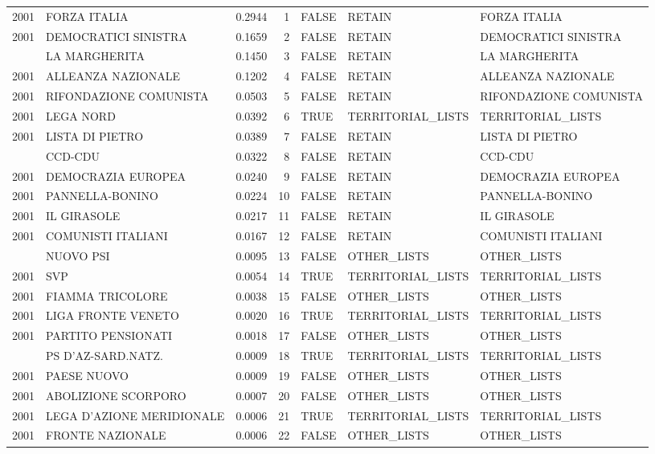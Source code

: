 \begin{longtable}[t]{rlrrlll}
2001 & FORZA ITALIA & 0.2944 & 1 & FALSE & RETAIN & FORZA ITALIA\\
2001 & DEMOCRATICI SINISTRA & 0.1659 & 2 & FALSE & RETAIN & DEMOCRATICI SINISTRA\\
\addlinespace
2001 & LA MARGHERITA & 0.1450 & 3 & FALSE & RETAIN & LA MARGHERITA\\
2001 & ALLEANZA NAZIONALE & 0.1202 & 4 & FALSE & RETAIN & ALLEANZA NAZIONALE\\
2001 & RIFONDAZIONE COMUNISTA & 0.0503 & 5 & FALSE & RETAIN & RIFONDAZIONE COMUNISTA\\
2001 & LEGA NORD & 0.0392 & 6 & TRUE & TERRITORIAL\_LISTS & TERRITORIAL\_LISTS\\
2001 & LISTA DI PIETRO & 0.0389 & 7 & FALSE & RETAIN & LISTA DI PIETRO\\
\addlinespace
2001 & CCD-CDU & 0.0322 & 8 & FALSE & RETAIN & CCD-CDU\\
2001 & DEMOCRAZIA EUROPEA & 0.0240 & 9 & FALSE & RETAIN & DEMOCRAZIA EUROPEA\\
2001 & PANNELLA-BONINO & 0.0224 & 10 & FALSE & RETAIN & PANNELLA-BONINO\\
2001 & IL GIRASOLE & 0.0217 & 11 & FALSE & RETAIN & IL GIRASOLE\\
2001 & COMUNISTI ITALIANI & 0.0167 & 12 & FALSE & RETAIN & COMUNISTI ITALIANI\\
\addlinespace
2001 & NUOVO PSI & 0.0095 & 13 & FALSE & OTHER\_LISTS & OTHER\_LISTS\\
2001 & SVP & 0.0054 & 14 & TRUE & TERRITORIAL\_LISTS & TERRITORIAL\_LISTS\\
2001 & FIAMMA TRICOLORE & 0.0038 & 15 & FALSE & OTHER\_LISTS & OTHER\_LISTS\\
2001 & LIGA FRONTE VENETO & 0.0020 & 16 & TRUE & TERRITORIAL\_LISTS & TERRITORIAL\_LISTS\\
2001 & PARTITO PENSIONATI & 0.0018 & 17 & FALSE & OTHER\_LISTS & OTHER\_LISTS\\
\addlinespace
2001 & PS D'AZ-SARD.NATZ. & 0.0009 & 18 & TRUE & TERRITORIAL\_LISTS & TERRITORIAL\_LISTS\\
2001 & PAESE NUOVO & 0.0009 & 19 & FALSE & OTHER\_LISTS & OTHER\_LISTS\\
2001 & ABOLIZIONE SCORPORO & 0.0007 & 20 & FALSE & OTHER\_LISTS & OTHER\_LISTS\\
2001 & LEGA D'AZIONE MERIDIONALE & 0.0006 & 21 & TRUE & TERRITORIAL\_LISTS & TERRITORIAL\_LISTS\\
2001 & FRONTE NAZIONALE & 0.0006 & 22 & FALSE & OTHER\_LISTS & OTHER\_LISTS\\

\end{longtable}
